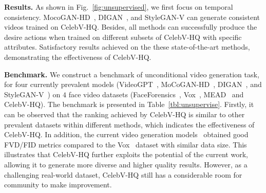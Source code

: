 \documentclass[runningheads]{llncs}
\begin{document}
\noindent
\textbf{Results.}
As shown in Fig.~\ref{fig:unsupervised}, we first focus on temporal consistency. MocoGAN-HD~\cite{mocoganhd}, DIGAN~\cite{digan}, and StyleGAN-V\cite{styleganv} can generate consistent videos trained on CelebV-HQ.
Besides, all methods can successfully produce the desire actions when trained on different subsets of CelebV-HQ with specific attributes. 
Satisfactory results achieved on the these state-of-the-art methods, demonstrating the effectiveness of CelebV-HQ. 



\noindent
\textbf{Benchmark.}
We construct a benchmark of unconditional video generation task, for four currently prevalent models (VideoGPT~\cite{yan2021videogpt}, MoCoGAN-HD~\cite{mocoganhd}, DIGAN~\cite{digan}, and StyleGAN-V~\cite{styleganv}) on $4$ face video datasets (FaceForensics~\cite{faceforensics}, Vox~\cite{vox17}, MEAD~\cite{mead} and CelebV-HQ). 
The benchmark is presented in Table~\ref{tbl:unsupervise}. 
Firstly, it can be observed that the ranking achieved by CelebV-HQ is similar to other prevalent datasets within different methods, which indicates the effectiveness of CelebV-HQ. 
In addition, the current video generation models~\cite{yan2021videogpt,mocoganhd,digan,styleganv} obtained good FVD/FID metrics compared to the Vox~\cite{vox17} dataset with similar data size. This illustrates that CelebV-HQ further exploits the potential of the current work, allowing it to generate more diverse and higher quality results.
However, as a challenging real-world dataset, CelebV-HQ still has a considerable room for community to make improvement.
\end{document}
